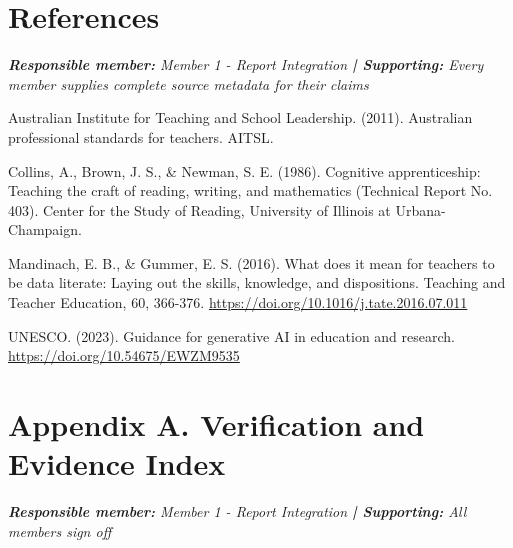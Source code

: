 \documentclass[11pt,a4paper]{article}
\begin{document}
\clearpage

\section*{References}


\noindent\textit{\textbf{Responsible member: }Member 1 - Report Integration\textbf{ | Supporting: }Every member supplies complete source metadata for their claims}\par

Australian Institute for Teaching and School Leadership. (2011). Australian professional standards for teachers. AITSL.\par

Collins, A., Brown, J. S., \& Newman, S. E. (1986). Cognitive apprenticeship: Teaching the craft of reading, writing, and mathematics (Technical Report No. 403). Center for the Study of Reading, University of Illinois at Urbana-Champaign.\par

Mandinach, E. B., \& Gummer, E. S. (2016). What does it mean for teachers to be data literate: Laying out the skills, knowledge, and dispositions. Teaching and Teacher Education, 60, 366-376. \url{https://doi.org/10.1016/j.tate.2016.07.011}\par

UNESCO. (2023). Guidance for generative AI in education and research. \url{https://doi.org/10.54675/EWZM9535}\par

\clearpage

\section*{Appendix A. Verification and Evidence Index}


\noindent\textit{\textbf{Responsible member: }Member 1 - Report Integration\textbf{ | Supporting: }All members sign off}\par
\end{document}
